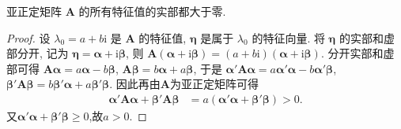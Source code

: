 \documentclass[../../main.tex]{subfiles}%
\begin{document}
\begin{proposition}\label{proposition:亚正定矩阵的所有特征值的实部都大于零}
亚正定矩阵 \(\boldsymbol{A}\) 的所有特征值的实部都大于零.
\end{proposition}
\begin{proof}
设 \(\lambda_0 = a + b\mathrm{i}\) 是 \(\boldsymbol{A}\) 的特征值, \(\boldsymbol{\eta}\) 是属于 \(\lambda_0\) 的特征向量. 将 \(\boldsymbol{\eta}\) 的实部和虚部分开, 记为 \(\boldsymbol{\eta}=\boldsymbol{\alpha}+\mathrm{i}\boldsymbol{\beta}\), 则 \(\boldsymbol{A}(\boldsymbol{\alpha}+\mathrm{i}\boldsymbol{\beta})=(a + b\mathrm{i})(\boldsymbol{\alpha}+\mathrm{i}\boldsymbol{\beta})\). 分开实部和虚部可得 \(\boldsymbol{A}\boldsymbol{\alpha}=a\boldsymbol{\alpha}-b\boldsymbol{\beta}\), \(\boldsymbol{A}\boldsymbol{\beta}=b\boldsymbol{\alpha}+a\boldsymbol{\beta}\), 于是 \(\boldsymbol{\alpha}'\boldsymbol{A}\boldsymbol{\alpha}=a\boldsymbol{\alpha}'\boldsymbol{\alpha}-b\boldsymbol{\alpha}'\boldsymbol{\beta}\), \(\boldsymbol{\beta}'\boldsymbol{A}\boldsymbol{\beta}=b\boldsymbol{\beta}'\boldsymbol{\alpha}+a\boldsymbol{\beta}'\boldsymbol{\beta}\). 因此再由$\boldsymbol{A}$为亚正定矩阵可得
\begin{align*}
\boldsymbol{\alpha}'\boldsymbol{A}\boldsymbol{\alpha}+\boldsymbol{\beta}'\boldsymbol{A}\boldsymbol{\beta}&=a(\boldsymbol{\alpha}'\boldsymbol{\alpha}+\boldsymbol{\beta}'\boldsymbol{\beta})>0.
\end{align*} 
又$\boldsymbol{\alpha}'\boldsymbol{\alpha}+\boldsymbol{\beta}'\boldsymbol{\beta}\geqslant 0$,故$a>0.$
\end{proof}
\end{document}
